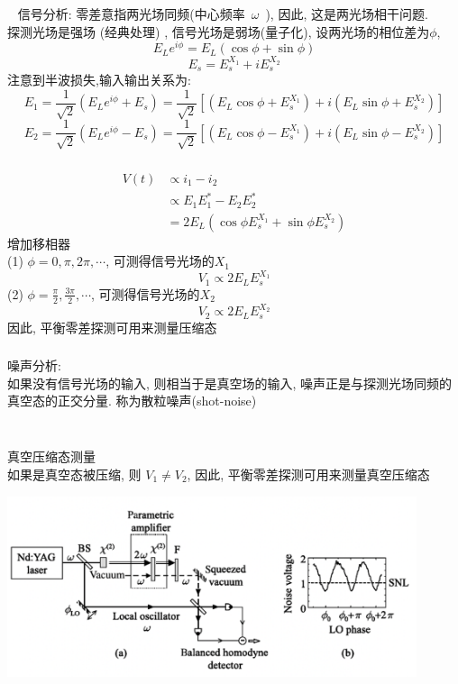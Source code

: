    
   \begin{frame}
       \frametitle{}~
       {\Bullet}信号分析: {\vspace*{0.3em}}
       零差意指两光场同频(中心频率~$\omega$~), 因此, 这是两光场相干问题. \\ 探测光场是强场 (经典处理) , 信号光场是弱场(量子化), 设两光场的相位差为$\phi$, 
       \[ E_L e^{i\phi} = E_L(\cos\phi + \sin\phi)\]
       \[ E_s  =  E_s ^{X_1}  + i E_s ^{X_2}\]
       注意到半波损失,输入输出关系为:
       \[ E_1  =  \frac{1}{\sqrt{2}} (E_L e^{i\phi} + E_s) = \frac{1}{\sqrt{2}} [ (E_L\cos\phi + E_s ^{X_1} ) + i (E_L\sin\phi + E_s ^{X_2} ) ]\]
       \[ E_2  =  \frac{1}{\sqrt{2}} (E_L e^{i\phi} - E_s) = \frac{1}{\sqrt{2}} [ (E_L\cos\phi - E_s ^{X_1} ) + i (E_L\sin\phi - E_s ^{X_2} ) ] \] 
      \end{frame}
   
      \begin{frame}
       \frametitle{}
       \[ \begin{aligned}
           V(t) &\propto  i_1 - i_2 \\ 
           &\propto  E_1 E^* _1 - E_2 E^* _2  \\ 
           &= 2 E_L ( \cos \phi E_s ^{X_1} + \sin \phi E_s ^{X_2} )
       \end{aligned} \]
       增加移相器\\  
       (1)  $\phi= 0, \pi, 2\pi, \cdots $, 可测得信号光场的$X_1$
       \[ V_1 \propto 2 E_L E_s ^{X_1} \]
       (2)  $\phi= \frac{\pi}{2}, \frac{3\pi}{2}, \cdots $, 可测得信号光场的$X_2$
       \[ V_2 \propto 2 E_L E_s ^{X_2} \]
       因此, 平衡零差探测可用来测量压缩态
      \end{frame}
   
      \begin{frame}
       \frametitle{}
       {\Bullet}噪声分析: \\ 
       如果没有信号光场的输入, 则相当于是真空场的输入, 噪声正是与探测光场同频的真空态的正交分量. 称为散粒噪声(shot-noise)  
   \end{frame}
   
   \begin{frame}
         \frametitle{}
         ~~\\ 
       {\Bullet}真空压缩态测量 \\ 
       如果是真空态被压缩, 则  $ V_1 \not= V_2$, 因此, 平衡零差探测可用来测量真空压缩态
         \begin{center}
              \includegraphics[width=0.9\textwidth]{figs/15.png}
         \end{center}
      \end{frame}